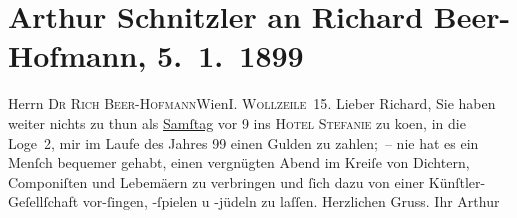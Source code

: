

         
         \renewcommand{\erwaehntePersonen}{Personen: Richard Beer-Hofmann}
         \renewcommand{\erwaehnteOrte}{Orte: Hotel Stefanie, IX., Alsergrund, Wien, Wollzeile}
         \renewcommand{\erwaehnteWerke}{}
               \section[Arthur Schnitzler an Richard Beer-Hofmann, 5. 1. 1899]{ Arthur Schnitzler an Richard Beer-Hofmann, 5. 1. 1899}\nopagebreak{}\rehead{ }\begin{ledgroupsized}[t]{13cm}\normalsize\beginnumbering{} \toendnotes[C]{\smallbreak\pagebreak[2]} 
\pstart{}{\pb}Herrn \textsc{Dr Rich
                     Beer-Hofmann}\pend{}\pstart{}Wien\pend{}\pstart{}\textsc{I. Wollzeile 15}.\pend{}{\bigskip}\pstart
           \noindent{}{\pb}Lieber Richard, Sie haben weiter nichts zu thun als \uline{Samſtag} vor 9 ins \textsc{Hotel Stefanie} zu ko{\geminationm}en, in die Loge 2, mir im Laufe des Jahres
                  99 einen Gulden zu zahlen; – nie hat es ein Menſch bequemer gehabt,
               einen vergnügten Abend im {\pb}Kreiſe von Dichtern,
               Componiſten und Lebemä{\geminationn}ern zu verbringen und ſich dazu
               von einer Künſtler-Geſellſchaft vor-ſingen, -ſpielen u -jüdeln zu laſſen. \pend
           \pstart Herzlichen Gruss. Ihr \spacefill\mbox{Arthur}\pend{}
         
         \endnumbering{}\end{ledgroupsized}  \newcommand{\dateiname}{L00875}\newcommand{\titel}{Arthur Schnitzler an Richard Beer-Hofmann, 5. 1. 1899}\newcommand{\editorInnen}{Martin Anton Müller und Gerd-Hermann Susen}
      